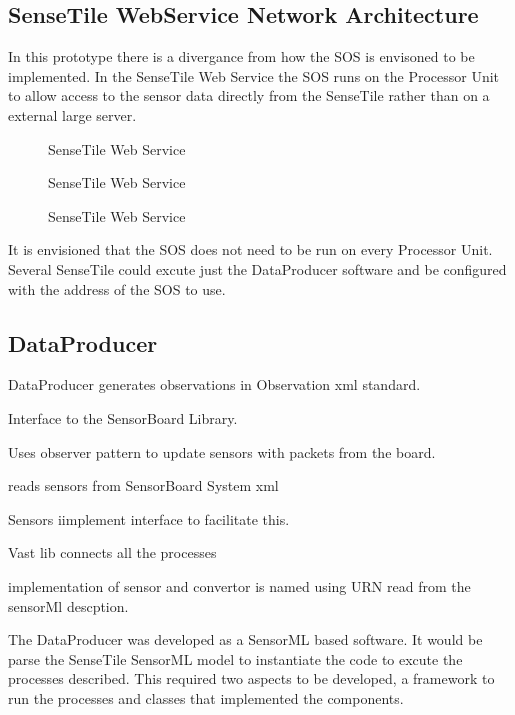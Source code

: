 \documentclass[]{final_report}
\begin{document}
\subsection{SenseTile WebService Network Architecture}
In this prototype there is a divergance from how the SOS is envisoned to be implemented. In the SenseTile Web Service the SOS runs on the Processor Unit to allow access to the sensor data directly from the SenseTile rather than on a external large server. 
\begin{figure}[h]
\caption{SenseTile Web Service}\label{fig:Deployment_network}
\end{figure}
\begin{figure}[h]
\caption{SenseTile Web Service}\label{fig:Deployment_ext_sos}
\end{figure}
\begin{figure}[h]
\caption{SenseTile Web Service}\label{fig:Deployment_sos_aggr}
\end{figure}
It is envisioned that the SOS does not need to be run on every Processor Unit. Several SenseTile could excute just the DataProducer software and be configured with the address of the SOS to use.



\subsection{DataProducer}

DataProducer generates observations in Observation xml standard.

Interface to the SensorBoard Library.

Uses observer pattern to update sensors with packets from the board.

reads sensors from SensorBoard System xml

Sensors iimplement interface to facilitate this.

Vast lib connects all the processes

implementation of sensor and convertor is named using URN read from the sensorMl descption.


The DataProducer was developed as a SensorML based software. It would be parse the SenseTile SensorML model to instantiate the code to excute the processes described. This required two aspects to be developed, a framework to run the processes and classes that implemented the components.
\end{document}

